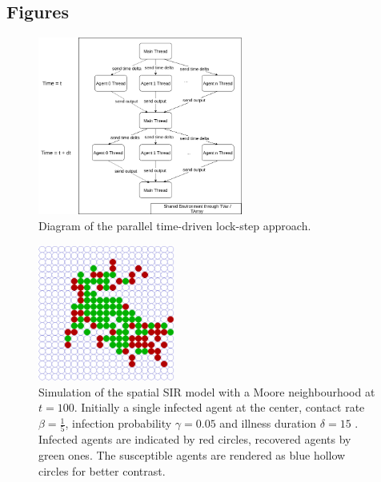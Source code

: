 \documentclass{bmcart}
\begin{document}
\begin{backmatter}

\section*{Figures}
\begin{figure}[h!]
	\includegraphics[width=0.6\textwidth, angle=0]{./stm_abs.png}
	\caption{Diagram of the parallel time-driven lock-step approach.}
	\label{fig:stm_abs_structure}
\end{figure}

\begin{figure}[h!]
	\includegraphics[width=0.4\textwidth, angle=0]{./sir_vis.png}
	\caption{Simulation of the spatial SIR model with a Moore neighbourhood at $t = 100$. Initially a single infected agent at the center, contact rate $\beta = \frac{1}{5}$, infection probability $\gamma = 0.05$ and illness duration $\delta = 15$ . Infected agents are indicated by red circles, recovered agents by green ones. The susceptible agents are rendered as blue hollow circles for better contrast.}
	\label{fig:vis_sir}
\end{figure}


\end{backmatter}
\end{document}
